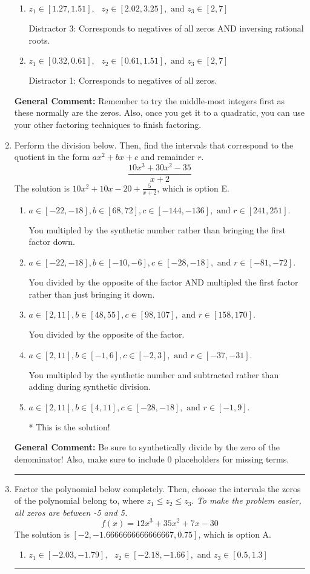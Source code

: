 \documentclass{extbook}[14pt]
\newcommand{\litem}[1]{\item #1

\rule{\textwidth}{0.4pt}}
\begin{document}
\begin{enumerate}
{\begin{enumerate}[label=\Alph*.]
* This is the solution!
\item \( z_1 \in [1.27, 1.51], \text{   }  z_2 \in [2.02, 3.25], \text{   and   } z_3 \in [2, 7] \)

 Distractor 3: Corresponds to negatives of all zeros AND inversing rational roots.
\item \( z_1 \in [0.32, 0.61], \text{   }  z_2 \in [0.61, 1.51], \text{   and   } z_3 \in [2, 7] \)

 Distractor 1: Corresponds to negatives of all zeros.
\end{enumerate}

\textbf{General Comment:} Remember to try the middle-most integers first as these normally are the zeros. Also, once you get it to a quadratic, you can use your other factoring techniques to finish factoring.
}
\litem{
Perform the division below. Then, find the intervals that correspond to the quotient in the form $ax^2+bx+c$ and remainder $r$.
\[ \frac{10x^{3} +30 x^{2} -35}{x + 2} \]The solution is \( 10x^{2} +10 x -20 + \frac{5}{x + 2} \), which is option E.\begin{enumerate}[label=\Alph*.]
\item \( a \in [-22, -18], b \in [68, 72], c \in [-144, -136], \text{ and } r \in [241, 251]. \)

 You multipled by the synthetic number rather than bringing the first factor down.
\item \( a \in [-22, -18], b \in [-10, -6], c \in [-28, -18], \text{ and } r \in [-81, -72]. \)

 You divided by the opposite of the factor AND multipled the first factor rather than just bringing it down.
\item \( a \in [2, 11], b \in [48, 55], c \in [98, 107], \text{ and } r \in [158, 170]. \)

 You divided by the opposite of the factor.
\item \( a \in [2, 11], b \in [-1, 6], c \in [-2, 3], \text{ and } r \in [-37, -31]. \)

 You multipled by the synthetic number and subtracted rather than adding during synthetic division.
\item \( a \in [2, 11], b \in [4, 11], c \in [-28, -18], \text{ and } r \in [-1, 9]. \)

* This is the solution!
\end{enumerate}

\textbf{General Comment:} Be sure to synthetically divide by the zero of the denominator! Also, make sure to include 0 placeholders for missing terms.
}
\litem{
Factor the polynomial below completely. Then, choose the intervals the zeros of the polynomial belong to, where $z_1 \leq z_2 \leq z_3$. \textit{To make the problem easier, all zeros are between -5 and 5.}
\[ f(x) = 12x^{3} +35 x^{2} +7 x -30 \]The solution is \( [-2, -1.6666666666666667, 0.75] \), which is option A.\begin{enumerate}[label=\Alph*.]
\item \( z_1 \in [-2.03, -1.79], \text{   }  z_2 \in [-2.18, -1.66], \text{   and   } z_3 \in [0.5, 1.3] \)


\end{enumerate}}
\end{enumerate}
\end{document}
